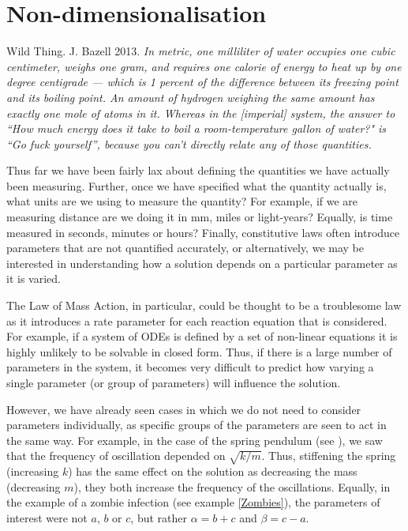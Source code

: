 \chapter{Non-dimensionalisation}\label{Non-dimensionalisation}
\begin{aquote}{Wild Thing. J. Bazell 2013.}
\textit{In metric, one milliliter of water occupies one cubic centimeter, weighs one gram, and requires one calorie of energy to heat up by one degree centigrade — which is 1 percent of the difference between its freezing point and its boiling point. An amount of hydrogen weighing the same amount has exactly one mole of atoms in it. Whereas in the [imperial] system, the answer to ``How much energy does it take to boil a room-temperature gallon of water?" is ``Go fuck yourself'', because you can't directly relate any of those quantities.}
\end{aquote}

Thus far we have been fairly lax about defining the quantities we have actually been measuring. Further, once we have specified what the quantity actually is, what units are we using to measure the quantity? For example, if we are measuring distance are we doing it in mm, miles or light-years? Equally, is time measured in seconds, minutes or hours? Finally, constitutive laws often introduce parameters that are not quantified accurately, or alternatively, we may be interested in understanding how a solution depends on a particular parameter as it is varied. 

The Law of Mass Action, in particular, could be thought to be a troublesome law as it introduces a rate parameter for each reaction equation that is considered. For example, if a system of ODEs is defined by a set of non-linear equations it is highly unlikely to be solvable in closed form. Thus, if there is a large number of parameters in the system, it becomes very difficult to predict how varying a single parameter (or group of parameters) will influence the solution.

However, we have already seen cases in which we do not need to consider parameters individually, as specific groups of the parameters are seen to act in the same way. For example, in the case of the spring pendulum (see ), we saw that the frequency of oscillation depended on $\sqrt{k/m}$. Thus, stiffening the spring (increasing $k$) has the same effect on the solution as decreasing the mass (decreasing $m$), \ie they both increase the frequency of the oscillations. Equally, in the example of a zombie infection (see example \ref{Zombies}), the parameters of interest were not $a$, $b$ or $c$, but rather $\alpha=b+c$ and $\beta=c-a$.

